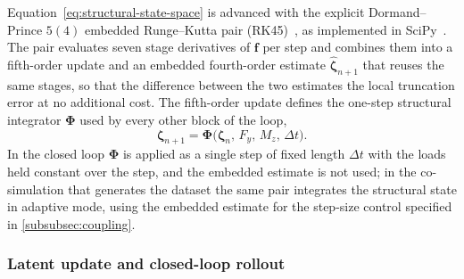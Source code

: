 Equation~\eqref{eq:structural-state-space} is advanced with the explicit Dormand--Prince $5(4)$ embedded Runge--Kutta pair (RK45)~\cite{dormand1980}, as implemented in SciPy~\cite{virtanen2020scipy}. The pair evaluates seven stage derivatives of $\mathbf{f}$ per step and combines them into a fifth-order update and an embedded fourth-order estimate $\widehat{\boldsymbol{\zeta}}_{n+1}$ that reuses the same stages, so that the difference between the two estimates the local truncation error at no additional cost. The fifth-order update defines the one-step structural integrator $\boldsymbol{\Phi}$ used by every other block of the loop,
\begin{equation}
    \boldsymbol{\zeta}_{n+1} = \boldsymbol{\Phi}\bigl(\boldsymbol{\zeta}_n,\,F_y,\,M_z,\,\Delta t\bigr).
    \label{eq:rk45_update}
\end{equation}
In the closed loop $\boldsymbol{\Phi}$ is applied as a single step of fixed length $\Delta t$ with the loads held constant over the step, and the embedded estimate is not used; in the co-simulation that generates the dataset the same pair integrates the structural state in adaptive mode, using the embedded estimate for the step-size control specified in \cref{subsubsec:coupling}.

\subsubsection{Latent update and closed-loop rollout}
\label{subsubsec:rollout}

